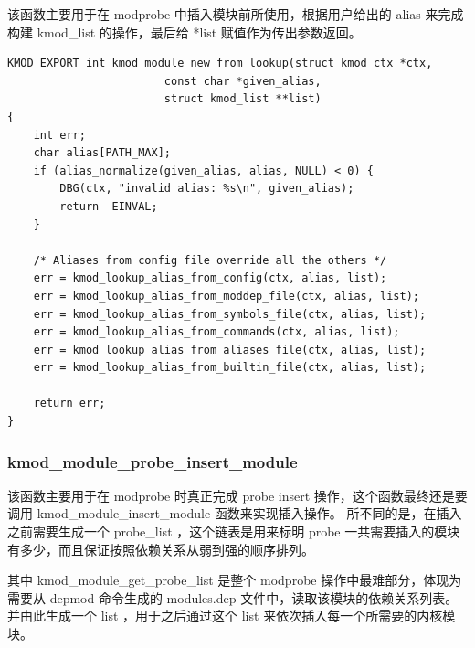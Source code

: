 \documentclass[11pt,a4paper]{article}
\begin{document}
该函数主要用于在 modprobe 中插入模块前所使用，根据用户给出的 alias
来完成构建 kmod\_list 的操作，最后给 *list 赋值作为传出参数返回。

{\begin{shaded}\begin{verbatim}
KMOD_EXPORT int kmod_module_new_from_lookup(struct kmod_ctx *ctx,
                        const char *given_alias,
                        struct kmod_list **list)
{
    int err;
    char alias[PATH_MAX];
    if (alias_normalize(given_alias, alias, NULL) < 0) {
        DBG(ctx, "invalid alias: %s\n", given_alias);
        return -EINVAL;
    }

    /* Aliases from config file override all the others */
    err = kmod_lookup_alias_from_config(ctx, alias, list);
    err = kmod_lookup_alias_from_moddep_file(ctx, alias, list);
    err = kmod_lookup_alias_from_symbols_file(ctx, alias, list);
    err = kmod_lookup_alias_from_commands(ctx, alias, list);
    err = kmod_lookup_alias_from_aliases_file(ctx, alias, list);
    err = kmod_lookup_alias_from_builtin_file(ctx, alias, list);

    return err;
}
\end{verbatim}\end{shaded}}
\subsubsection{kmod\_module\_probe\_insert\_module}

该函数主要用于在 modprobe 时真正完成 probe insert
操作，这个函数最终还是要调用 kmod\_module\_insert\_module
函数来实现插入操作。 所不同的是，在插入之前需要生成一个 probe\_list
，这个链表是用来标明 probe
一共需要插入的模块有多少，而且保证按照依赖关系从弱到强的顺序排列。

其中 kmod\_module\_get\_probe\_list 是整个 modprobe
操作中最难部分，体现为需要从 depmod 命令生成的 modules.dep
文件中，读取该模块的依赖关系列表。 并由此生成一个 list ，用于之后通过这个
list 来依次插入每一个所需要的内核模块。
\end{document}
